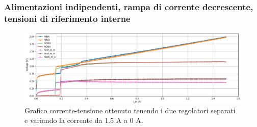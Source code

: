 % 
%
%


\subsubsection{Alimentazioni indipendenti, rampa di corrente decrescente, tensioni di riferimento interne}
\begin{figure}
\centering
\includegraphics[width=\textwidth]{Immagini/IDI2}
\caption{Grafico corrente-tensione ottenuto tenendo i due regolatori separati e variando la corrente da 1.5 A a 0 A.}
\label{IDI}
\end{figure}


